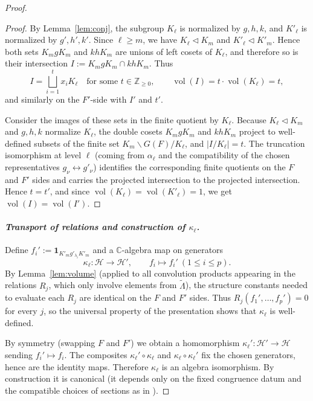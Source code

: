 \documentclass[american]{article}
\numberwithin{equation}{section}
\numberwithin{figure}{section}
\theoremstyle{plain}
\theoremstyle{definition}
\theoremstyle{remark}
\DeclareMathOperator{\vol}{vol}
\newcommand{\one}{\mathbf{1}}
\newcommand{\C}{\mathbb{C}}
\newcommand{\Z}{\mathbb{Z}}
\begin{document}
\begin{proof}
\begin{proof}
By Lemma~\ref{lem:conj}, the subgroup \(K_\ell\) is normalized by \(g,h,k\), and \(K'_\ell\) is normalized by \(g',h',k'\).
Since \(\ell\ge m\), we have \(K_\ell\triangleleft K_m\) and \(K'_\ell\triangleleft K'_m\). Hence both sets
\(K_m g K_m\) and \(k h K_m\) are unions of left cosets of \(K_\ell\), and therefore so is their intersection
\(I:=K_m g K_m\cap k h K_m\). Thus
\[
I=\bigsqcup_{i=1}^t x_i K_\ell
\quad\text{for some }t\in\Z_{\ge 0},
\qquad
\vol(I)=t\cdot \vol(K_\ell)=t,
\]
and similarly on the \(F'\)-side with \(I'\) and \(t'\).

Consider the images of these sets in the finite quotient by \(K_\ell\). Because \(K_\ell\triangleleft K_m\) and
\(g,h,k\) normalize \(K_\ell\), the double cosets \(K_m g K_m\) and \(k h K_m\) project to well-defined subsets of the
finite set \(K_m\backslash G(F)/K_\ell\), and \(|I/K_\ell|=t\).
The truncation isomorphism at level \(\ell\) (coming from \(\alpha_\ell\) and the compatibility of the chosen representatives
\(g_\nu\leftrightarrow g'_\nu\)) identifies the corresponding finite quotients on the \(F\) and \(F'\) sides and carries
the projected intersection to the projected intersection. Hence \(t=t'\), and since \(\vol(K_\ell)=\vol(K'_\ell)=1\),
we get \(\vol(I)=\vol(I')\).
\end{proof}

\paragraph{\textit{Transport of relations and construction of \(\kappa_\ell\).}}
Define \(f_i':=\one_{K'_m g'_{\lambda_i}K'_m}\) and a \(\C\)-algebra map on generators
\[
   \kappa_{\ell}: {\mathscr{H}} \longrightarrow {\mathscr{H}}',
   \qquad f_i\longmapsto f_i' \ (1\le i\le p).
\]
By Lemma~\ref{lem:volume} (applied to all convolution products appearing in the relations \(R_j\), which only involve
elements from \(\tilde\Lambda\)), the structure constants needed to evaluate each \(R_j\) are identical on the \(F\) and \(F'\) sides.
Thus \(R_j(f_1',\dots,f_p')=0\) for every \(j\), so the universal property of the presentation shows that \(\kappa_\ell\) is
well-defined.

By symmetry (swapping \(F\) and \(F'\)) we obtain a homomorphism \(\kappa_\ell':{\mathscr{H}}'\to {\mathscr{H}}\) sending
\(f_i'\mapsto f_i\). The composites \(\kappa_\ell'\circ \kappa_\ell\) and \(\kappa_\ell\circ\kappa_\ell'\) fix the chosen generators,
hence are the identity maps. Therefore \(\kappa_\ell\) is an algebra isomorphism. By construction it is canonical (it depends only
on the fixed congruence datum and the compatible choices of sections as in \cite[Lem.~2.4]{ganapathy2022}).
\end{proof}
\end{document}
